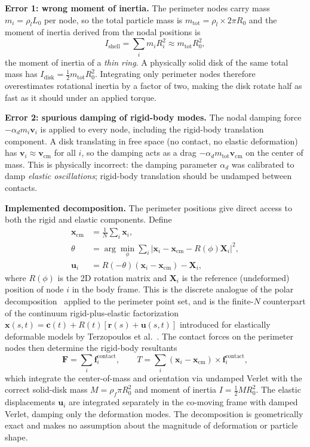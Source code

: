 \documentclass[aps,pre,twocolumn,floatfix,longbibliography]{revtex4-2}
\begin{document}
\textbf{Error 1: wrong moment of inertia.}
The perimeter nodes carry mass $m_i = \rho_l L_0$ per node, so the total
particle mass is $m_\text{tot} = \rho_l \times 2\pi R_0$ and the moment of
inertia derived from the nodal positions is
\begin{equation}
  I_\text{shell} = \sum_i m_i R_i^2 \approx m_\text{tot} R_0^2,
\label{eq:Ishell}
\end{equation}
the moment of inertia of a \emph{thin ring}.  A physically solid disk of the
same total mass has $I_\text{disk} = \tfrac{1}{2} m_\text{tot} R_0^2$.
Integrating only perimeter nodes therefore overestimates rotational inertia by
a factor of two, making the disk rotate half as fast as it should under an
applied torque.

\textbf{Error 2: spurious damping of rigid-body modes.}
The nodal damping force $-\alpha_d m_i \mathbf{v}_i$ is applied to every node,
including the rigid-body translation component.  A disk translating in free
space (no contact, no elastic deformation) has
$\mathbf{v}_i \approx \mathbf{v}_\text{cm}$ for all $i$, so the damping acts
as a drag $-\alpha_d m_\text{tot} \mathbf{v}_\text{cm}$ on the center of mass.
This is physically incorrect: the damping parameter $\alpha_d$ was calibrated
to damp \emph{elastic oscillations}; rigid-body translation should be undamped
between contacts.

\textbf{Implemented decomposition.}
The perimeter positions give direct access to both the rigid and elastic
components.  Define
\begin{align}
  \mathbf{x}_\text{cm} &= \frac{1}{N}\sum_i \mathbf{x}_i,
  \label{eq:xcm}\\
  \theta &= \arg\!\min_\phi \sum_i |\mathbf{x}_i - \mathbf{x}_\text{cm}
    - R(\phi)\mathbf{X}_i|^2,
  \label{eq:theta}\\
  \mathbf{u}_i &= R(-\theta)(\mathbf{x}_i - \mathbf{x}_\text{cm}) - \mathbf{X}_i,
  \label{eq:ui}
\end{align}
where $R(\phi)$ is the 2D rotation matrix and $\mathbf{X}_i$ is the reference
(undeformed) position of node $i$ in the body frame.  This is the discrete
analogue of the polar decomposition~\cite{Gurtin1981} applied to the perimeter
point set, and is the finite-$N$ counterpart of the continuum
rigid-plus-elastic factorization $\mathbf{x}(s,t) = \mathbf{c}(t) +
R(t)[\mathbf{r}(s) + \mathbf{u}(s,t)]$ introduced for elastically
deformable models by Terzopoulos et al.~\cite{Terzopoulos1987}.
The contact forces on the perimeter nodes then determine the
rigid-body resultants
\begin{equation}
  \mathbf{F} = \sum_i \mathbf{f}_i^\text{contact},
  \qquad
  T = \sum_i (\mathbf{x}_i - \mathbf{x}_\text{cm}) \times
      \mathbf{f}_i^\text{contact},
\label{eq:FT}
\end{equation}
which integrate the center-of-mass and orientation via undamped Verlet with the
correct solid-disk mass $M = \rho_f \pi R_0^2$ and moment of inertia
$I = \tfrac{1}{2}MR_0^2$.  The elastic displacements $\mathbf{u}_i$ are
integrated separately in the co-moving frame with damped Verlet, damping only
the deformation modes.  The decomposition is geometrically exact and makes no
assumption about the magnitude of deformation or particle shape.
\end{document}
